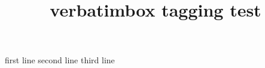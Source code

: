 \documentclass{article}
\title{verbatimbox tagging test}
\begin{document}
\begin{verbbox}[\(\bullet\)\hspace{1ex}]
first line
second line
third line
\end{verbbox}
\theverbbox
\end{document}
